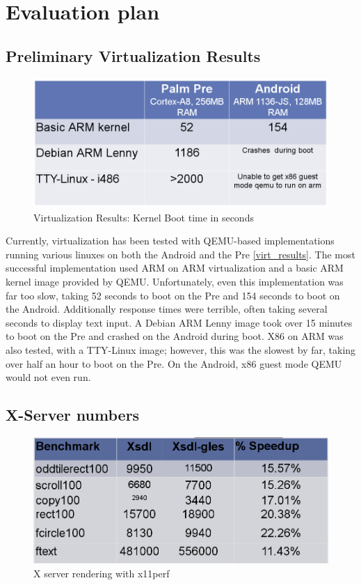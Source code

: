 \section{Evaluation plan}

\subsection{Preliminary Virtualization Results}

\begin{figure}[tbh]
\centering
\includegraphics[width=1.0\columnwidth]{virtualization_results}
\caption{Virtualization Results: Kernel Boot time in seconds}
\label{fig:virt_results}
\end{figure}

Currently, virtualization has been tested with QEMU-based implementations running various linuxes on both the Android and the Pre \ref{virt_results}.  The most successful implementation used ARM on ARM virtualization and a basic ARM kernel image provided by QEMU.  Unfortunately, even this implementation was far too slow, taking 52 seconds to boot on the Pre and 154 seconds to boot on the Android.  Additionally response times were terrible, often taking several seconds to display text input.  A Debian ARM Lenny image took over 15 minutes to boot on the Pre and crashed on the Android during boot.  X86 on ARM was also tested, with a TTY-Linux image; however, this was the slowest by far, taking over half an hour to boot on the Pre.  On the Android, x86 guest mode QEMU would not even run.

\subsection{X-Server numbers}

\begin{figure}[tbh]
\centering
\includegraphics[width=1.0\columnwidth]{x_results}
\caption{X server rendering with x11perf}
\label{fig:x_results}
\end{figure}
